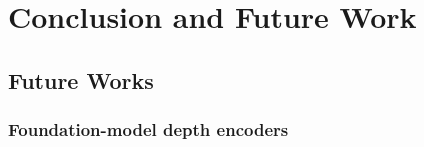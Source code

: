 \section{Conclusion and Future Work}
\label{sec:conclusion}

\subsection{Future Works}

\subsubsection{Foundation-model depth encoders}
